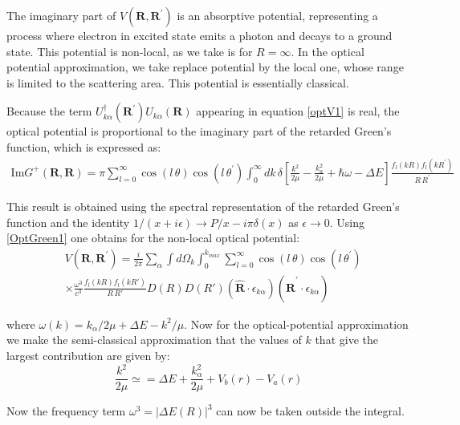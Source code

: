 The imaginary part of $ V(\mathbf{R},\mathbf{R}^{'}) $ is an absorptive potential, representing a process where electron in excited state emits a photon and decays to a ground state. This potential is non-local, as we take is for $ R = \infty $. In the optical potential approximation, we take replace potential by the local one, whose range is limited to the scattering area. This potential is essentially classical.

Because the term $ U_{k\alpha}^{\dagger}(\mathbf{R}^{'})U_{k\alpha}(\mathbf{R}) $ appearing in equation \eqref{optV1} is real, the optical potential is proportional to the imaginary part of the retarded Green's function, which is expressed as:
\begin{equation}\label{OptGreen1}
\begin{split}
\text{Im} G^{+}(\mathbf{R},\mathbf{R}) = \pi\sum_{l=0}^{\infty}{\cos(l\, \theta)\cos(l\,\theta^{'})\int_0^{\infty}{dk\,\delta\left[\frac{k^2}{2\mu} - \frac{k^2_a}{2\mu} + \hbar\omega - \Delta E \right]\frac{f_l(kR)f_l(kR^{'})}{R\,R^{'}} }  }
\end{split}
\end{equation}

This result is obtained using the spectral representation of the retarded Green's function and the identity $ 1/(x + i\epsilon) \rightarrow P/x - i\pi\delta(x) $ as $ \epsilon \rightarrow 0 $. Using \eqref{OptGreen1} one obtains for the non-local optical potential:
\begin{equation}\label{optV2}
\begin{split}
&V(\mathbf{R},\mathbf{R}^{'}) = \frac{i}{2\pi}\sum_{\alpha}\int{d\Omega_k}\int_0^{k_{max}}\sum_{l=0}^{\infty}\cos(l\, \theta)\cos(l\,\theta^{'}) \\[.8em]
&\times\frac{\omega^3}{c^3}\frac{f_l(kR)f_l(kR')}{R\,R'}D(R)D(R')(\hat{\mathbf{R}}\cdot\epsilon_{k\alpha})(\hat{\mathbf{R}}^{'}\cdot\epsilon_{k\alpha})
\end{split}
\end{equation}

where $ \omega(k) = k_{\alpha}/2\mu + \Delta E - k^2/\mu $.  Now for the optical-potential approximation we make the semi-classical approximation that the values of $ k $ that give the largest contribution are given by:
\begin{equation}
\frac{k^2}{2\mu} \simeq = \Delta E + \frac{k_{\alpha}^2}{2\mu} + V_b(r) - V_a(r)
\end{equation}

Now the frequency term $ \omega^3 = \left|\Delta E(R)\right|^3 $ can now be taken outside the integral.

